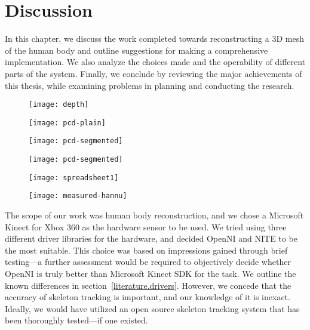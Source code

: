 \chapter{Discussion}

In this chapter, we discuss the work completed towards reconstructing a 3D mesh of the human body and outline suggestions for making a comprehensive implementation. We also analyze the choices made and the operability of different parts of the system. Finally, we conclude by reviewing the major achievements of this thesis, while examining problems in planning and conducting the research.

 \label{fig:phases}

\begin{figure}
    \centering
    \begin{minipage}{0.49\textwidth}
        \texttt{[image: depth]}
    \end{minipage}
    \begin{minipage}{0.49\textwidth}
        \texttt{[image: pcd-plain]}
    \end{minipage}
    \begin{minipage}{0.49\textwidth}
        \texttt{[image: pcd-segmented]}
    \end{minipage}
    \begin{minipage}{0.49\textwidth}
        \texttt{[image: pcd-segmented]}
    \end{minipage}
    \begin{minipage}{0.49\textwidth}
        \texttt{[image: spreadsheet1]}
    \end{minipage}
    \begin{minipage}{0.49\textwidth}
        \texttt{[image: measured-hannu]}
    \end{minipage}
    \caption{}
    \label{fig:steps}
\end{figure}


\newtopic

The scope of our work was human body reconstruction, and we chose a Microsoft Kinect for Xbox 360 as the hardware sensor to be used. We tried using three different driver libraries for the hardware, and decided OpenNI and NITE to be the most suitable. This choice was based on impressions gained through brief testing---a further assessment would be required to objectively decide whether OpenNI is truly better than Microsoft Kinect SDK for the task. We outline the known differences in section~\ref{literature.drivers}. However, we concede that the accuracy of skeleton tracking is important, and our knowledge of it is inexact. Ideally, we would have utilized an open source skeleton tracking system that has been thoroughly tested---if one existed.


